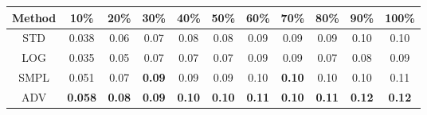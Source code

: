 \documentclass{standalone}
\begin{document}
\begin{tabular}{c|cccccccccc}
      \toprule
      Method & 10\% & 20\% & 30\% & 40\% & 50\% & 60\% & 70\% & 80\% & 90\% & 100\% \\
      \midrule
STD & 0.038 & 0.06 & 0.07 & 0.08 & 0.08 & 0.09 & 0.09 & 0.09 & 0.10 & 0.10\\
LOG & 0.035 & 0.05 & 0.07 & 0.07 & 0.07 & 0.09 & 0.09 & 0.07 & 0.08 & 0.09\\
SMPL & 0.051 & 0.07 & \textbf{0.09} & 0.09 & 0.09 & 0.10 & \textbf{0.10} & 0.10 & 0.10 & 0.11\\
ADV & \textbf{0.058} & \textbf{0.08} & \textbf{0.09} & \textbf{0.10} & \textbf{0.10} & \textbf{0.11} & \textbf{0.10} & \textbf{0.11} & \textbf{0.12} & \textbf{0.12}\\
  \bottomrule
\end{tabular}
\end{document}
